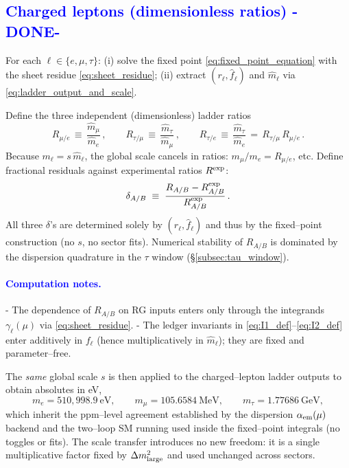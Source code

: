 \documentclass[%
 amsmath,amssymb,
 aps,
prb,
floatfix, showkeys
]{revtex4-2}
\newcommand{\modif}[1]{\textcolor{blue}{#1}}
\begin{document}
{\modif{
\subsection{Charged leptons (dimensionless ratios)  -DONE-}
\label{subsec:leptons_ratios}
}}
For each $\ell\in\{e,\mu,\tau\}$:
(i) solve the fixed point \eqref{eq:fixed_point_equation} with the sheet residue \eqref{eq:sheet_residue};
(ii) extract $(r_\ell,\widehat f_\ell)$ and $\widehat m_\ell$ via \eqref{eq:ladder_output_and_scale}.

Define the three independent (dimensionless) ladder ratios
\begin{equation}
  R_{\mu/e} \,\equiv\, \frac{\widehat m_\mu}{\widehat m_e}\,,\qquad
  R_{\tau/\mu} \,\equiv\, \frac{\widehat m_\tau}{\widehat m_\mu}\,,\qquad
  R_{\tau/e} \,\equiv\, \frac{\widehat m_\tau}{\widehat m_e}
  \,=\, R_{\tau/\mu}\,R_{\mu/e}\,.
  \label{eq:lepton_ratios}
\end{equation}
Because $m_\ell = s\,\widehat m_\ell$, the global scale cancels in ratios: $m_\mu/m_e = R_{\mu/e}$, etc.
Define fractional residuals against experimental ratios $R^{\rm exp}$:
\begin{equation}
  \delta_{A/B} \;\equiv\; \frac{R_{A/B} - R^{\rm exp}_{A/B}}{R^{\rm exp}_{A/B}}\,.
  \label{eq:ratio_residuals}
\end{equation}
All three $\delta$'s are determined solely by $(r_\ell,\widehat f_\ell)$ and thus by the fixed--point construction (no $s$, no sector fits). Numerical stability of $R_{A/B}$ is dominated by the dispersion quadrature in the $\tau$ window (\S\ref{subsec:tau_window}).

\paragraph{\modif{ Computation notes.} }
- The dependence of $R_{A/B}$ on RG inputs enters only through the integrands $\gamma_\ell(\mu)$ via \eqref{eq:sheet_residue}.
- The ledger invariants in \eqref{eq:I1_def}–\eqref{eq:I2_def} enter additively in $f_\ell$ (hence multiplicatively in $\widehat m_\ell$); they are fixed and parameter--free.


The \emph{same} global scale $s$ is then applied to the charged--lepton ladder outputs to obtain absolutes in eV,
\[
m_e=510{,}998.9~\text{eV},\qquad
m_\mu=105.6584~\text{MeV},\qquad
m_\tau=1.77686~\text{GeV},
\]
which inherit the ppm--level agreement established by the dispersion $\alpha_{\rm em}(\mu)$ backend and the two--loop SM running used inside the fixed--point integrals (no toggles or fits). The scale transfer introduces no new freedom: it is a single multiplicative factor fixed by $\Delta m^2_{\rm large}$ and used unchanged across sectors.
\end{document}
